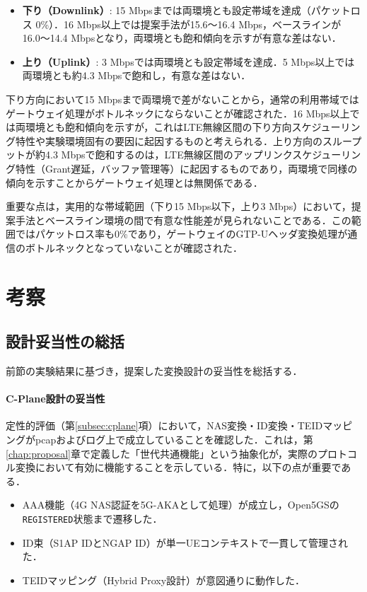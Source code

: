 \begin{itemize}
    \item \textbf{下り（Downlink）}: 15 Mbpsまでは両環境とも設定帯域を達成（パケットロス 0\%）．16 Mbps以上では提案手法が15.6〜16.4 Mbps，ベースラインが16.0〜14.4 Mbpsとなり，両環境とも飽和傾向を示すが有意な差はない．
    \item \textbf{上り（Uplink）}: 3 Mbpsでは両環境とも設定帯域を達成．5 Mbps以上では両環境とも約4.3 Mbpsで飽和し，有意な差はない．
\end{itemize}
下り方向において15 Mbpsまで両環境で差がないことから，通常の利用帯域ではゲートウェイ処理がボトルネックにならないことが確認された．16 Mbps以上では両環境とも飽和傾向を示すが，これはLTE無線区間の下り方向スケジューリング特性や実験環境固有の要因に起因するものと考えられる．上り方向のスループットが約4.3 Mbpsで飽和するのは，LTE無線区間のアップリンクスケジューリング特性（Grant遅延，バッファ管理等）に起因するものであり，両環境で同様の傾向を示すことからゲートウェイ処理とは無関係である．

重要な点は，実用的な帯域範囲（下り15 Mbps以下，上り3 Mbps）において，提案手法とベースライン環境の間で有意な性能差が見られないことである．この範囲ではパケットロス率も0\%であり，ゲートウェイのGTP-Uヘッダ変換処理が通信のボトルネックとなっていないことが確認された．

\section{考察}

\subsection{設計妥当性の総括}
前節の実験結果に基づき，提案した変換設計の妥当性を総括する．

\paragraph{C-Plane設計の妥当性}
定性的評価（第\ref{subsec:cplane}項）において，NAS変換・ID変換・TEIDマッピングがpcapおよびログ上で成立していることを確認した．これは，第\ref{chap:proposal}章で定義した「世代共通機能」という抽象化が，実際のプロトコル変換において有効に機能することを示している．特に，以下の点が重要である．
\begin{itemize}
    \item AAA機能（4G NAS認証を5G-AKAとして処理）が成立し，Open5GSの\texttt{REGISTERED}状態まで遷移した．
    \item ID束（S1AP IDとNGAP ID）が単一UEコンテキストで一貫して管理された．
    \item TEIDマッピング（Hybrid Proxy設計）が意図通りに動作した．
\end{itemize}

